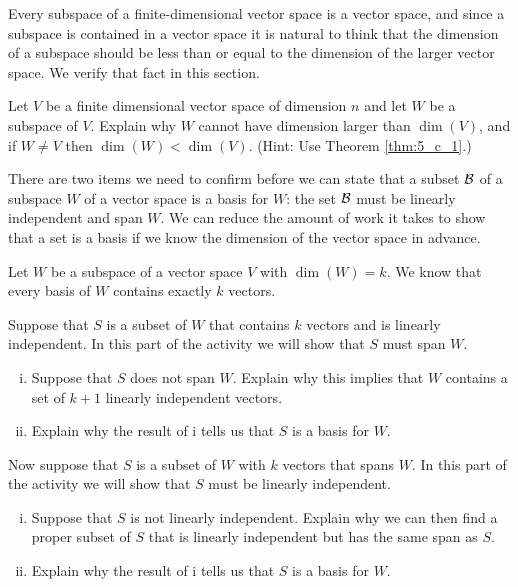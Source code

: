 
Every subspace of a finite-dimensional vector space is a vector space, and since a subspace is contained in a vector space it is natural to think that the dimension of a subspace should be less than or equal to the dimension of the larger vector space. We verify that fact in this section.


\begin{activity} \label{act:5_c_3} Let $V$ be a finite dimensional vector space of dimension $n$ and let $W$ be a subspace of $V$. Explain why $W$ cannot have dimension larger than $\dim(V)$, and if $W \neq V$ then $\dim(W) < \dim(V)$. (Hint: Use Theorem \ref{thm:5_c_1}.)

\end{activity}



There are two items we need to confirm before we can state that a subset $\mathcal{B}$ of a subspace $W$ of a vector space is a basis for $W$: the set $\mathcal{B}$ must be linearly independent and span $W$. We can reduce the amount of work it takes to show that a set is a basis if we know the dimension of the vector space in advance. 


\begin{activity} \label{act:5_c_5} Let $W$ be a subspace of a vector space $V$ with $\dim(W) = k$. We know that every basis of $W$ contains exactly $k$ vectors. 
	\ba
	\item Suppose that $S$ is a subset of $W$ that contains $k$ vectors and is linearly independent. In this part of the activity we will show that $S$ must span $W$.
		\begin{enumerate}[i.]
		\item Suppose that $S$ does not span $W$. Explain why this implies that $W$ contains a set of $k+1$ linearly independent vectors. 		

	\item Explain why the result of i tells us that $S$ is a basis for $W$. 

	\end{enumerate}

\item Now suppose that $S$ is a subset of $W$ with $k$ vectors that spans $W$. In this part of the activity we will show that $S$ must be linearly independent.
	\begin{enumerate}[i.]
	\item Suppose that $S$ is not linearly independent. Explain why we can then find a proper subset of $S$ that is linearly independent but has the same span as $S$. 


	\item Explain why the result of i tells us that $S$ is a basis for $W$. 


	\end{enumerate}

\ea

\end{activity}



